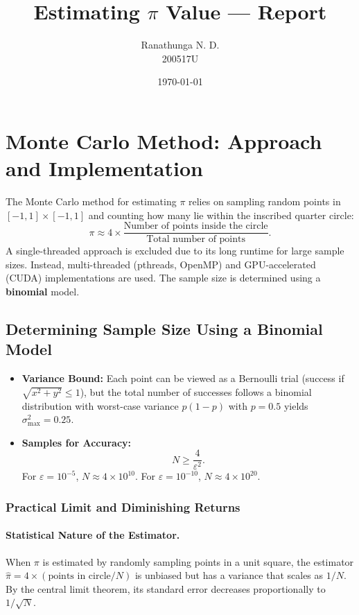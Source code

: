 \documentclass[12pt]{article}
\title{Estimating \(\pi\) Value --- Report}
\author{Ranathunga N. D. \\ 200517U}
\date{\today}
\begin{document}
\maketitle

\tableofcontents

\section{Monte Carlo Method: Approach and Implementation}\label{sec:monte-carlo-impl}

The Monte Carlo method for estimating \(\pi\) relies on sampling random points
in \([-1,1]\times[-1,1]\) and counting how many lie within the inscribed
quarter circle:
\[
      \pi \approx 4 \times \frac{\text{Number of points inside the circle}}{\text{Total number of points}}.
\]
A single-threaded approach is excluded due to its long runtime for large
sample sizes. Instead, multi-threaded (pthreads, OpenMP) and GPU-accelerated
(CUDA) implementations are used. The sample size is determined using a
\textbf{binomial} model.

\subsection{Determining Sample Size Using a Binomial Model}\label{sec:bernoulli}
\begin{itemize}
      \item \textbf{Variance Bound:} Each point can be viewed as a Bernoulli trial (success if
            \(\sqrt{x^2 + y^2} \le 1\)), but the total number of successes follows a binomial
            distribution with worst-case variance \(p(1-p)\) with \(p = 0.5\) yields
            \(\sigma^2_{\max} = 0.25\).
      \item \textbf{Samples for Accuracy:}
            \[
                  N \ge \frac{4}{\varepsilon^2}.
            \]
            For \(\varepsilon = 10^{-5}\), \(N \approx 4\times10^{10}\). For \(\varepsilon
            = 10^{-10}\), \(N \approx4\times10^{20}\).
\end{itemize}

\subsubsection{Practical Limit and Diminishing Returns}
\paragraph{Statistical Nature of the Estimator.}
When \(\pi\) is estimated by randomly sampling points in a unit square, the
estimator \(\hat{\pi} = 4 \times (\text{points in circle}/N)\) is unbiased but
has a variance that scales as \(1/N\). By the central limit theorem, its
standard error decreases proportionally to \(1/\sqrt{N}\).
\end{document}
